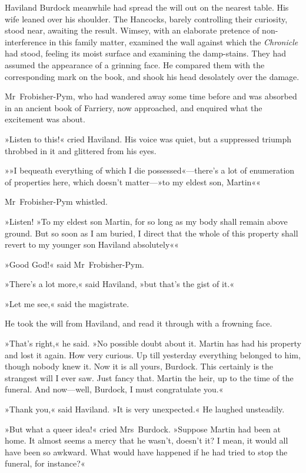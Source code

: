 Haviland Burdock meanwhile had spread the will out on the nearest table. His wife leaned over his shoulder. The Hancocks, barely controlling their curiosity, stood near, awaiting the result. Wimsey, with an elaborate pretence of non-interference in this family matter, examined the wall against which the \textit{Chronicle} had stood, feeling its moist surface and examining the damp-stains. They had assumed the appearance of a grinning face. He compared them with the corresponding mark on the book, and shook his head desolately over the damage.

Mr~Frobisher-Pym, who had wandered away some time before and was absorbed in an ancient book of Farriery, now approached, and enquired what the excitement was about.

»Listen to this!« cried Haviland. His voice was quiet, but a suppressed triumph throbbed in it and glittered from his eyes.

»»I bequeath everything of which I die possessed«—there's a lot of enumeration of properties here, which doesn't matter—»to my eldest son, Martin«\longdash«

Mr~Frobisher-Pym whistled.

»Listen! »To my eldest son Martin, for so long as my body shall remain above ground. But so soon as I am buried, I direct that the whole of this property shall revert to my younger son Haviland absolutely«\longdash«

»Good God!« said Mr~Frobisher-Pym.

»There's a lot more,« said Haviland, »but that's the gist of it.«

»Let me see,« said the magistrate.

He took the will from Haviland, and read it through with a frowning face.

»That's right,« he said. »No possible doubt about it. Martin has had his property and lost it again. How very curious. Up till yesterday everything belonged to him, though nobody knew it. Now it is all yours, Burdock. This certainly is the strangest will I ever saw. Just fancy that. Martin the heir, up to the time of the funeral. And now—well, Burdock, I must congratulate you.«

»Thank you,« said Haviland. »It is very unexpected.« He laughed unsteadily.

»But what a queer idea!« cried Mrs~Burdock. »Suppose Martin had been at home. It almost seems a mercy that he wasn't, doesn't it? I mean, it would all have been so awkward. What would have happened if he had tried to stop the funeral, for instance?«

